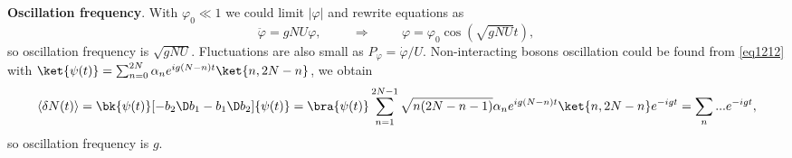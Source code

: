 \textbf{Oscillation frequency}. With $\varphi_0 \ll 1$ we could limit $|\varphi|$ and rewrite equations as
\begin{equation*}
	\ddot{\varphi} = g N U \varphi,
	\hspace{1cm} \Rightarrow \hspace{1cm}
	\varphi = \varphi_0 \cos(\sqrt{gNU} t),
\end{equation*}
so oscillation frequency is $\sqrt{g N U}$. Fluctuations are also small as $P_\varphi = \dot{\varphi}/U$. Non-interacting bosons oscillation could be found from \eqref{eq1212} with $\ket{\psi(t)} = \sum_{n=0}^{2N} \alpha_n e^{i g (N-n) t} \ket{n,2N-n}$, we obtain
\begin{equation*}
	\langle \delta N(t)\rangle = \bk{\psi(t)}[- b_2\D b_1 - b_1\D b_2]{\psi(t)} = \bra{\psi(t)} \sum_{n=1}^{2N-1} \sqrt{n(2N-n-1)} \alpha_n  e^{i g (N-n)t}\ket{n,2N-n} e^{-i g t} = \sum_n ... e^{-igt},
\end{equation*}
so oscillation frequency is $g$.






